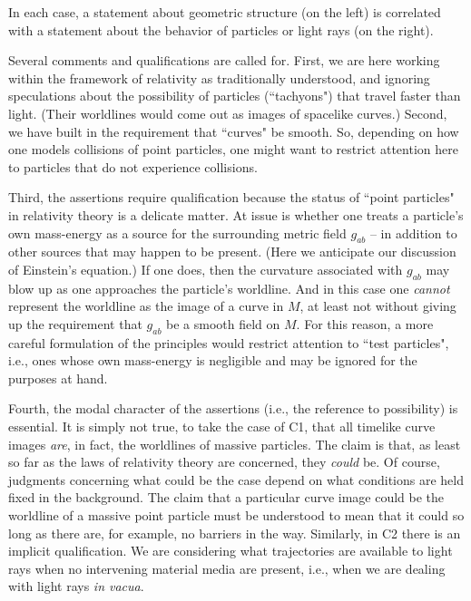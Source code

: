 \documentclass [12] {article}
\theoremstyle{plain}
\numberwithin{figure}{subsection}
\numberwithin{proposition}{subsection}
\begin{document}
%
\noindent  In each case, a statement about geometric structure (on the left) is correlated with a statement about the behavior of particles or light rays (on the right).

Several comments and qualifications are called for.  First,  we are here working within the framework of relativity as traditionally understood, and ignoring speculations about the possibility of particles (``tachyons") that travel faster than light.  (Their worldlines would come out as images of spacelike curves.)   Second, we have built in the requirement that ``curves" be smooth.  So, depending on how one models collisions of point particles, one might want to restrict attention here to particles that do not experience collisions. 

Third,  the assertions  require qualification because the status of ``point particles" in relativity theory is a delicate matter.  At issue is whether one treats a particle's own mass-energy as a source for the surrounding metric field $g_{ab}$  -- in addition to  other sources that may happen to be present.  (Here we anticipate our  discussion of Einstein's equation.) If one does, then the curvature associated with $g_{ab}$  may blow up as one approaches the particle's worldline.  And in this case one \emph{cannot} represent the worldline as the image of a curve in $M$, at least not without giving up the requirement that $g_{ab}$ be a smooth  field  on $M$. For this reason, a more careful formulation of the principles would restrict attention to ``test particles", i.e., ones whose own mass-energy is negligible and may be ignored for the purposes at hand.

Fourth, the modal character of the assertions (i.e., the reference to possibility)  is essential. It is simply not true, to take the case of C1,  that all timelike curve images \emph{are}, in fact, the worldlines of  massive particles. The claim is that, as least so far as the laws of relativity theory are concerned, they \emph{could} be.  Of course, judgments concerning what could be the  case depend on what conditions are held fixed in the background. %
The claim that a particular curve image could be the worldline of a massive point particle must be understood to mean that it could so long as there are, for example, no  barriers in the way.  Similarly, in C2  there is an implicit qualification. We are considering what trajectories are available to light rays when no intervening material media are present, i.e., when we are dealing with light rays \emph{in vacua}.
\end{document}
